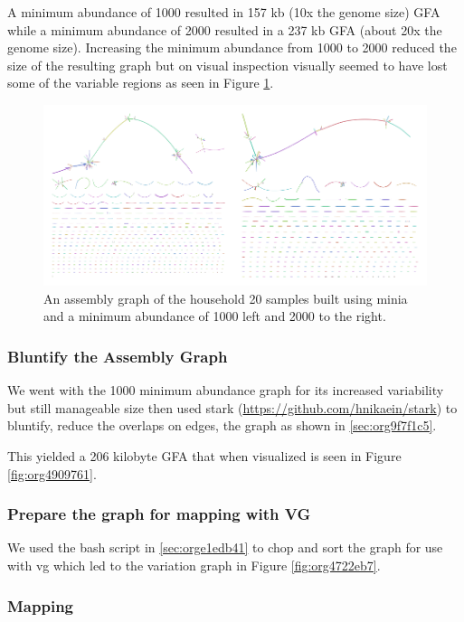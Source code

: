 \documentclass[10pt, a4paper]{article}
\begin{document}
A minimum abundance of 1000 resulted in 157 kb (10x the genome size) GFA
while a minimum abundance of 2000 resulted in a 237 kb GFA
(about 20x the genome size).
Increasing the minimum abundance from 1000 to 2000 reduced the size of the 
resulting graph but on visual inspection visually seemed to have lost some of 
the variable regions as seen in Figure \ref{fig:org7254fde}.

\begin{figure}[h]
\centering
\includegraphics[width=.9\linewidth]{../Figures/RSV/Assembly_Combined.png}
\caption[RSV Assembly Graph]{\label{fig:org7254fde}
An assembly graph of the household 20 samples built using minia and a minimum abundance of 1000 left and 2000 to the right.}
\end{figure}

\subsubsection{Bluntify the Assembly Graph}
\label{sec:org3897854}
We went with the 1000 minimum abundance graph for its increased variability but 
still manageable size then used stark (\url{https://github.com/hnikaein/stark}) to 
bluntify, reduce the overlaps on edges, \cite{gargGraphbasedApproachDiploid2018} the graph as shown in
\ref{sec:org9f7f1c5}.

This yielded a 206 kilobyte GFA that when visualized is seen in Figure
\ref{fig:org4909761}.

\subsubsection{Prepare the graph for mapping with VG}
\label{sec:orgacf27f3}
We used the bash script in \ref{sec:orge1edb41} to chop and sort the graph for 
use with vg \cite{garrisonVariationGraphToolkit2018} which led to the variation graph in Figure \ref{fig:org4722eb7}.

\subsubsection{Mapping}
\label{sec:org6a2d6fa}
\end{document}
